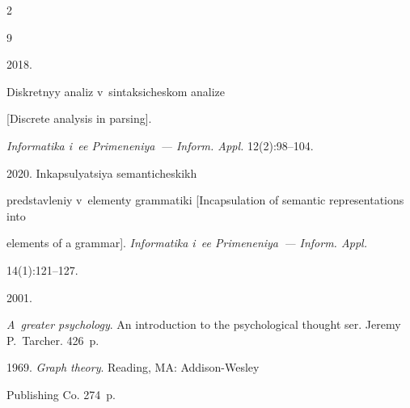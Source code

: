 












  \begin{multicols}{2}



\renewcommand{\bibname}{\protect\rmfamily References}




{\small\frenchspacing

 {%


 \begin{thebibliography}{9}


 2018. 

Diskretnyy analiz v~sintaksicheskom analize

[Discrete analysis in parsing].

\textit{Informatika i~ee Primeneniya~--- Inform. Appl.} 12(2):98--104.


 2020. Inkapsulyatsiya semanticheskikh 

predstavleniy v~elementy grammatiki [Incapsulation of semantic representations into 

elements of a grammar]. \textit{Informatika i~ee Primeneniya~--- Inform. Appl.}  

14(1):121--127.


 2001. 

\textit{A~greater psychology}. An introduction to the psychological thought ser. Jeremy P.~Tarcher. 426~p.






 1969. \textit{Graph theory}. Reading, MA: Addison-Wesley 

Publishing Co. 274~p.


\end{thebibliography}}}
\end{multicols}
